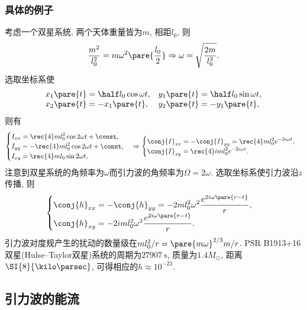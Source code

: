 \documentclass[hidelinks]{ctexart}
\def\sun{\odot}
\begin{document}

\subsubsection{具体的例子} %
\label{ssub:具体的例子}

考虑一个双星系统, 两个天体重量皆为$m$, 相距$l_0$, 则
\[ \frac{m^2}{l_0^2} = m\omega^2\pare{\frac{l_0}{2}} \Rightarrow \omega = \sqrt{\frac{2m}{l_0^3}}. \]
选取坐标系使
\[ \begin{array}{ll}
    \displaystyle x_1\pare{t} = \half l_0 \cos \omega t, & \displaystyle y_1\pare{t} = \half l_0 \sin\omega t, \\
    x_2\pare{t} = -x_1\pare{t}, & y_2\pare{t} = -y_1\pare{t},
\end{array} \]
则有
\[ \begin{cases}
    \displaystyle I_{xx} = \rec{4}ml_0^2 \cos 2\omega t + \const, \\
    \displaystyle I_{yy} = -\rec{4} m l_0^2 \cos 2\omega t + \const, \\
    \displaystyle I_{xy} = \rec{4}ml_0 \sin 2\omega t,
\end{cases} \Rightarrow \begin{cases}
    \displaystyle \conj{I}_{xx} = -\conj{I}_{yy} = \rec{4} ml_0^2 e^{-2i\omega t}, \\
    \displaystyle \conj{I}_{xy} = \rec{4}i ml_0^2 e^{-2i\omega t}.
\end{cases} \]
注意到双星系统的角频率为$\omega$而引力波的角频率为$\Omega = 2\omega$. 选取坐标系使引力波沿$z$传播, 则
\[ \begin{cases}
    \displaystyle \conj{h}_{xx} = -\conj{h}_{yy} = -2ml_0^2 \omega^2 \frac{e^{2i\omega\pare{r-t}}}{r}, \\
    \displaystyle \conj{h}_{xy} = -2iml_0^2 \omega^2 \frac{e^{2i\omega\pare{r-t}}}{r}.
\end{cases} \]
引力波对度规产生的扰动的数量级在$ml_0^2/r = \pare{m\omega}^{2/3}m/r$. PSR B1913+16双星(Hulse–Taylor双星)系统的周期为$\SI{27907}{\second}$, 质量为$1.4 M_{\sun}$, 距离$\SI{8}{\kilo\parsec}$, 可得相应的$h\approx 10^{-23}$.



\subsection{引力波的能流} %
\label{sub:引力波的能流}
\end{document}
